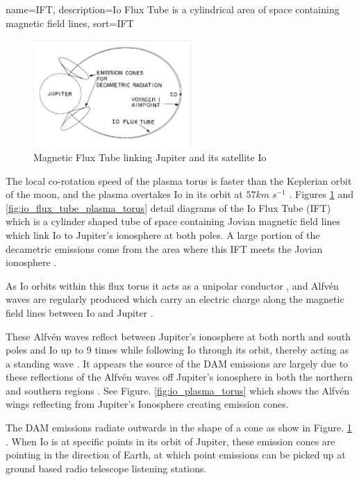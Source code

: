 \documentclass[runningheads,a4paper]{llncs}
\begin{document}
%
{
  name={IFT},
  description={Io Flux Tube is a cylindrical area of space containing magnetic field lines},
  sort=IFT
}
%

%
\begin{figure}[here]
\centering
\includegraphics[width=6cm]{images/03}
\caption{Magnetic Flux Tube linking Jupiter and its satellite Io \citep{belcher87}}
\label{fig:io_flux_tube}
\end{figure}
%

The local co-rotation speed of the plasma torus is faster than the Keplerian orbit of the moon, and the plasma overtakes Io in its orbit at \begin{math} 57 km\;s^{-1} \end{math} \citep{belcher87}. Figures \ref{fig:io_flux_tube} and \ref{fig:io_flux_tube_plasma_torus} detail diagrams of the Io Flux Tube (\gls{IFT}) which is a cylinder shaped tube of space containing Jovian magnetic field lines \citep{belcher87} which link Io to Jupiter's ionosphere at both poles. A large portion of the decametric emissions come from the area where this \gls{IFT} meets the Jovian ionosphere \citep{belcher87}. 

As Io orbits within this flux torus it acts as a unipolar conductor \citep{bose08}, and Alfv\'en waves are regularly produced which carry an electric charge along the magnetic field lines between Io and Jupiter \citep{bose08}.

These Alfv\'en waves reflect between Jupiter's ionosphere at both north and south poles and Io up to 9 times \citep{bose08} while following Io through its orbit, thereby acting as a standing wave \citep{bose08}. It appears the source of the \gls{DAM} emissions are largely due to these reflections of the Alfv\'en waves off Jupiter's ionosphere in both the northern and southern regions \citep{bose08}. See Figure. \ref{fig:io_plasma_torus} which shows the Alfv\'en wings reflecting from Jupiter's Ionosphere creating emission cones.

The \gls{DAM} emissions radiate outwards in the shape of a cone as show in Figure. \ref{fig:io_flux_tube} \citep{belcher87}. When Io is at specific points in its orbit of Jupiter, these emission cones are pointing in the direction of Earth, at which point emissions can be picked up at ground based radio telescope listening stations.
\end{document}
